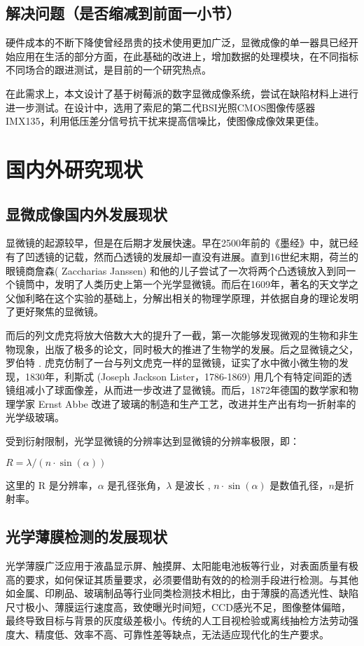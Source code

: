 \subsection{解决问题（是否缩减到前面一小节）}
硬件成本的不断下降使曾经昂贵的技术使用更加广泛，显微成像的单一器具已经开始应用在生活的部分方面，在此基础的改进上，增加数据的处理模块，在不同指标不同场合的跟进测试，是目前的一个研究热点。

在此需求上，本文设计了基于树莓派的数字显微成像系统，尝试在缺陷材料上进行进一步测试。在设计中，选用了索尼的第二代BSI光照CMOS图像传感器IMX135，利用低压差分信号抗干扰来提高信噪比，使图像成像效果更佳。


\section{国内外研究现状}
\subsection{显微成像国内外发展现状}
显微镜的起源较早，但是在后期才发展快速。早在2500年前的《墨经》中，就已经有了凹透镜的记载，然而凸透镜的发展却一直没有进展。直到16世纪末期，荷兰的眼镜商詹森( Zaccharias Janssen) 和他的儿子尝试了一次将两个凸透镜放入到同一个镜筒中，发明了人类历史上第一个光学显微镜。而后在1609年，著名的天文学之父伽利略在这个实验的基础上，分解出相关的物理学原理，并依据自身的理论发明了更好聚焦的显微镜。

而后的列文虎克将放大倍数大大的提升了一截，第一次能够发现微观的生物和非生物现象，出版了极多的论文，同时极大的推进了生物学的发展。后之显微镜之父，罗伯特﹒虎克仿制了一台与列文虎克一样的显微镜，证实了水中微小微生物的发现，1830年，利斯忒 (Joseph Jackson Lister，1786-1869) 用几个有特定间距的透镜组减小了球面像差，从而进一步改进了显微镜。而后，1872年德国的数学家和物理学家 Ernst Abbe 改进了玻璃的制造和生产工艺，改进并生产出有均一折射率的光学级玻璃。\cite{microimaging}\cite{microimagingelc}

受到衍射限制，光学显微镜的分辨率达到显微镜的分辨率极限，即：
\begin{center}
	$ R = \lambda/(n \cdot \sin(\alpha)) $ 
\end{center}
这里的 R 是分辨率，$\alpha$ 是孔径张角，$\lambda$ 是波长 , $n\cdot\sin(\alpha)$ 是数值孔径，$n$是折射率。 
	

\subsection{光学薄膜检测的发展现状}
 光学薄膜广泛应用于液晶显示屏、触摸屏、太阳能电池板等行业，对表面质量有极高的要求，如何保证其质量要求，必须要借助有效的的检测手段进行检测。与其他如金属、印刷品、玻璃制品等行业同类检测技术相比，由于薄膜的高透光性、缺陷尺寸极小、薄膜运行速度高，致使曝光时间短，CCD感光不足，图像整体偏暗，最终导致目标与背景的灰度级差极小。\cite{CCDCMOSf}传统的人工目视检验或离线抽检方法劳动强度大、精度低、效率不高、可靠性差等缺点，无法适应现代化的生产要求。


